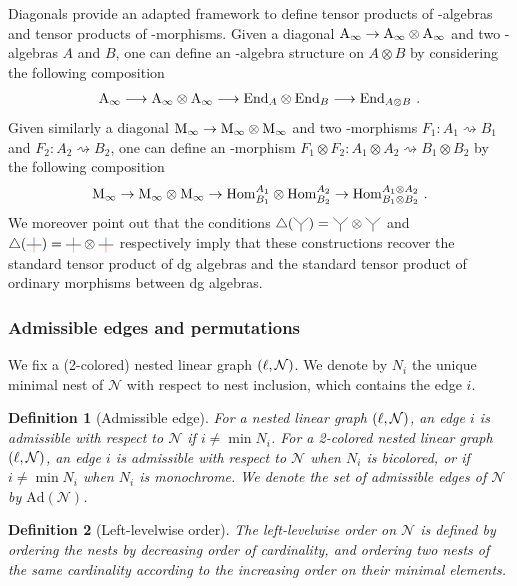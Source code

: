\documentclass[10pt]{amsart}
\newtheorem{definition}{Definition}[section]
\theoremstyle{remark}
\begin{document}
Diagonals provide an adapted framework to define tensor products of \Ainf -algebras and tensor products of \Ainf -morphisms.
Given a diagonal $\mathrm{A}_\infty \to \mathrm{A}_\infty \otimes \mathrm{A}_\infty$ and two \Ainf -algebras $A$ and $B$, one can define an \Ainf -algebra structure on $A \otimes B$ by considering the following composition
\[ \mathrm{A}_\infty \longrightarrow \mathrm{A}_\infty \otimes \mathrm{A}_\infty \longrightarrow \mathrm{End}_A \otimes \mathrm{End}_B \longrightarrow \mathrm{End}_{A \otimes B} \ . \]
Given similarly a diagonal $\mathrm{M}_\infty \to \mathrm{M}_\infty \otimes \mathrm{M}_\infty$ and two \Ainf -morphisms $F_1 : A_1 \rightsquigarrow B_1$ and $F_2 : A_2 \rightsquigarrow B_2$, one can define an \Ainf -morphism $F_1 \otimes F_2 : A_1 \otimes A_2 \rightsquigarrow B_1 \otimes B_2$ by the following composition
\[ \Minf \rightarrow \Minf \otimes \Minf \rightarrow \Hom^{A_1}_{B_1} \otimes \Hom^{A_2}_{B_2} \rightarrow  \Hom^{A_1 \otimes A_2}_{B_1 \otimes B_2} \ . \]
We moreover point out that the conditions $\triangle (\arbreopdeux) = \arbreopdeux \otimes \arbreopdeux$ and $\triangle ( \arbreopunmorph ) = \arbreopunmorph \otimes \arbreopunmorph$ respectively imply that these constructions recover the standard tensor product of dg algebras and the standard tensor product of ordinary morphisms between dg algebras.

\subsubsection{Admissible edges and permutations}

We fix a (2-colored) nested linear graph $(\ell,\mathcal{N})$.
We denote by $N_i$ the unique minimal nest of $\mathcal{N}$ with respect to nest inclusion, which contains the edge $i$.  

\begin{definition}[Admissible edge]
For a nested linear graph $(\ell,\mathcal{N})$, an edge $i$ is \emph{admissible} with respect to $\mathcal{N}$ if $i \neq \min N_i$. 
For a 2-colored nested linear graph $(\ell,\mathcal{N})$, an edge $i$ is \emph{admissible} with respect to $\mathcal{N}$ when $N_i$ is bicolored, or if $i \neq \min N_i$ when $N_i$ is monochrome.
We denote the set of admissible edges of $\mathcal{N}$ by $\mathrm{Ad}(\mathcal{N})$. 
\end{definition}

\begin{definition} [Left-levelwise order]
\label{def:left-levelwise-graph}
The \emph{left-levelwise order} on $\mathcal{N}$ is defined by ordering the nests by decreasing order of cardinality, and ordering two nests of the same cardinality according to the increasing order on their minimal elements. 
\end{definition}
\end{document}
